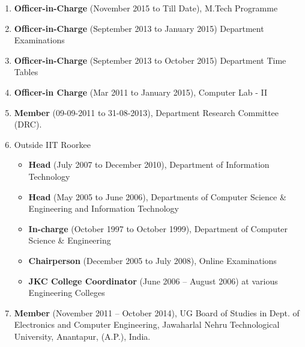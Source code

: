 \begin{enumerate}
\item
\textbf{Officer-in-Charge} (November 2015 to Till Date), M.Tech Programme

\item
\textbf{Officer-in-Charge} (September 2013 to January 2015) Department Examinations

\item
\textbf{Officer-in-Charge} (September 2013 to October 2015) Department Time Tables

\item
\textbf{Officer-in Charge} (Mar 2011 to January 2015), Computer Lab - II

\item
\textbf{Member} (09-09-2011 to 31-08-2013), Department Research Committee (DRC).

\item
Outside IIT Roorkee

\begin{itemize}
\item
\textbf{Head} (July 2007 to December 2010), Department of Information Technology 

\item
\textbf{Head} (May 2005 to June 2006), Departments of Computer Science \& Engineering and Information Technology

\item
\textbf{In-charge} (October 1997 to October 1999), Department of Computer Science \& Engineering

\item
\textbf{Chairperson} (December 2005 to July 2008), Online Examinations

\item
\textbf{JKC College Coordinator} (June 2006 – August 2006) at various Engineering Colleges
\end{itemize}


\item
\textbf{Member} (November 2011 – October 2014), UG Board of Studies in Dept. of Electronics and Computer Engineering, Jawaharlal Nehru Technological University, Anantapur, (A.P.), India.	

\end{enumerate}